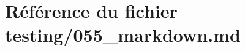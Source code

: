 \hypertarget{055__markdown_8md}{}\section{Référence du fichier testing/055\+\_\+markdown.md}
\label{055__markdown_8md}
